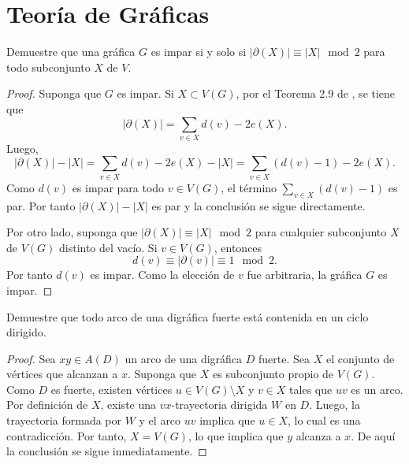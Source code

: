\documentclass[12pt]{article}
\newenvironment{problem}[2][Problema]{\begin{trivlist}
\item[\hskip \labelsep {\bfseries #1}\hskip \labelsep {\bfseries #2.}]}{\end{trivlist}}
\begin{document}
\section*{Teoría de Gráficas}


\begin{problem}{2.5.5} Demuestre que una gráfica $G$ es impar si y solo si $\lvert \partial(X) \rvert \equiv \lvert X \rvert \mod 2$ para todo subconjunto $X$ de $V.$
\end{problem}
\begin{proof}
Suponga que $G$ es impar. Si $X \subset V(G)$, por el Teorema 2.9 de \cite{10.5555/1481153}, se tiene que
$$\lvert \partial(X) \rvert = \sum_{v \in X} d(v) - 2 e(X).$$
Luego, 
$$ \lvert \partial(X) \rvert - \lvert X \rvert = \sum_{v \in X} d(v) - 2 e(X) - \lvert X \lvert = \sum_{v \in X} (d(v) - 1) - 2 e(X).$$
Como $d(v)$ es impar para todo $v \in V(G)$, el término $\sum_{v \in X} (d(v) - 1)$ es par. Por tanto $\lvert \partial (X) \rvert - \lvert X \rvert $ es par y la conclusión se sigue directamente.

Por otro lado, suponga que $\lvert \partial (X) \rvert \equiv \lvert X \rvert \mod 2$ para cualquier subconjunto $X$ de $V(G)$ distinto del vacío. Si $v \in V(G)$, entonces 
$$ d(v) \equiv \lvert \partial (v) \rvert \equiv 1 \mod 2.$$
Por tanto $d(v)$ es impar. Como la elección de $v$ fue arbitraria, la gráfica $G$ es impar. 
\end{proof}

\begin{problem}{2.5.6} Demuestre que todo arco de una digráfica fuerte está contenida en un ciclo dirigido.
\end{problem}
\begin{proof} Sea $xy \in A(D)$ un arco de una digráfica $D$ fuerte. Sea $X$ el conjunto de vértices que alcanzan a $x$. Suponga que $X$ es subconjunto propio de $V(G).$ Como $D$ es fuerte, existen vértices $u\in V(G)\setminus X$ y $v\in X$ tales que $uv$ es un arco. Por definición de $X$, existe una $vx$-trayectoria dirigida $W$ en $D$. Luego, la trayectoria formada por $W$ y el arco $uv$ implica que $u\in X$, lo cual es una contradicción. Por tanto, $X = V(G)$, lo que implica que $y$ alcanza a $x.$ De aquí la conclusión se sigue inmediatamente.


\end{proof}
\end{document}
